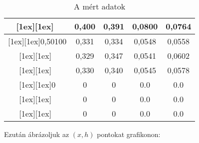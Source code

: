 \documentclass[12pt]{article}
\begin{document}
\begin{table}[H]
\begin{center}
\begin{tabular}{|
c|
c|
c|
c|
c|
}
\raisebox{-2.0\totalheight}[1ex][1ex]{~}
 & 0,400
 & 0,391
 & 0,0800
 & 0,0764
\\
        \hline
        
\raisebox{-2.0\totalheight}[1ex][1ex]{0,50100}
 & 0,331
 & 0,334
 & 0,0548
 & 0,0558
\\
        
\raisebox{-2.0\totalheight}[1ex][1ex]{~}
 & 0,329
 & 0,347
 & 0,0541
 & 0,0602
\\
        
\raisebox{-2.0\totalheight}[1ex][1ex]{~}
 & 0,330
 & 0,340
 & 0,0545
 & 0,0578
\\
        \hline
        
\raisebox{-2.0\totalheight}[1ex][1ex]{0}
 & 0
 & 0
 & 0.0
 & 0.0
\\
        
\raisebox{-2.0\totalheight}[1ex][1ex]{~}
 & 0
 & 0
 & 0.0
 & 0.0
\\
        
\raisebox{-2.0\totalheight}[1ex][1ex]{~}
 & 0
 & 0
 & 0.0
 & 0.0
\\
        \hline
      \end{tabular}
      \caption{A mért adatok}
      \label{tab:}
    \end{center}
  \end{table}

Ezután ábrázoljuk az $(x,h)$ pontokat grafikonon:
\end{document}

